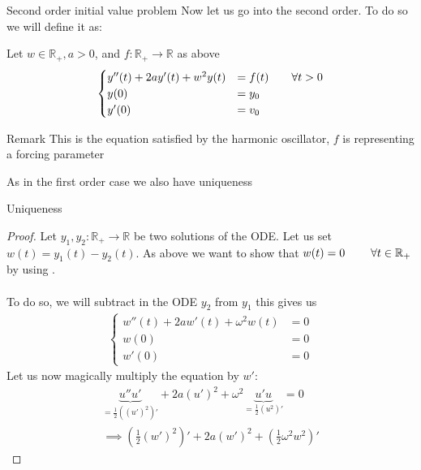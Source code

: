 \begin{parag}{Second order initial value problem}
    	Now let us go into the second order. To do so we will define it as:
		\begin{definition}
			Let $w \in \mathbb{R}_+, a > 0$, and $f: \mathbb{R}_+ \to \mathbb{R}$ as above 
			\begin{align*} 
				\begin{cases}
					y''\left(t\right) + 2ay'\left(t\right) + w^2 y\left(t\right) &=  f\left(t\right) \mathspace \mathspace \forall t > 0\\
					y\left(0\right) &=  y_0\\
					y'\left(0\right) &= v_0
				\end{cases}
			\end{align*}
		\end{definition}
		\begin{subparag}{Remark}
		    This is the equation satisfied by the harmonic oscillator, $f$ is representing a forcing parameter
		\end{subparag}
		As in the first order case we also have uniqueness
		\begin{subparag}{Uniqueness}
		    \begin{proof}
		        Let $y_1, y_2: \mathbb{R}_+ \to \mathbb{R}$ be two solutions of the ODE. Let us set $w\left(t\right) = y_1\left(t\right) - y_2\left(t\right)$. As above we want to show that $w\left(t\right) = 0 \mathspace \mathspace \; \forall t \in \mathbb{R}_+$ by using .\\
				$ $\\
				To do so, we will subtract in the ODE $y_2$ from $y_1$ this gives us
				\begin{align*} 
					\begin{cases}
						w''\left(t\right) + 2aw'\left(t\right) + \omega^2 w\left(t\right) &= 0 \\
					w\left(0\right) &= 0\\
					w'\left(0\right) &= 0
					\end{cases}
				\end{align*}
				Let us now magically multiply the equation by $w'$:
				\begin{align*} 
						\underbrace{u''u'}_{= \frac{1}{2}\left(\left(u'\right)^2\right)'} + 2a\left(u'\right)^2 + \omega^2 \underbrace{u'u}_{= \frac{1}{2}\left(u^2\right)'} = 0\\
																																										\implies \left(\frac{1}{2}\left(w'\right)^2\right)' + 2a \left(w'\right)^2 + \left(\frac{1}{2}\omega^2 w^2\right)'

\end{align*}
\end{proof}
\end{subparag}
\end{parag}
